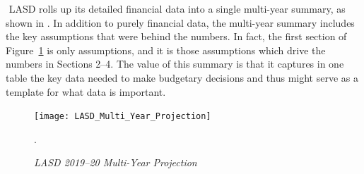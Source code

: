     ﻿
    LASD rolls up its detailed financial data into a single multi-year summary, as shown in . In addition to purely financial data, the multi-year summary includes the key
    assumptions that were behind the numbers. In fact, the first section of Figure~\ref{fig:multi-year-proj} is only assumptions, and it is those assumptions which drive the numbers in Sections 2–4. The value of this summary is that it captures in one table the key data needed to make budgetary decisions and thus might serve as a template for what data is important. 
    ﻿
    \begin{figure}[!t]
      \centering
      \caption[LASD 2019–20 Multi-Year Projection]{\textit{LASD 2019–20 Multi-Year Projection}}%
      \label{fig:multi-year-proj}
      \texttt{[image: LASD\_Multi\_Year\_Projection]}\
      \footnotesize\raggedright\textcite[137]{Kenyon2021a}.
    \end{figure}\bigskip%
    ﻿
    ﻿
    
